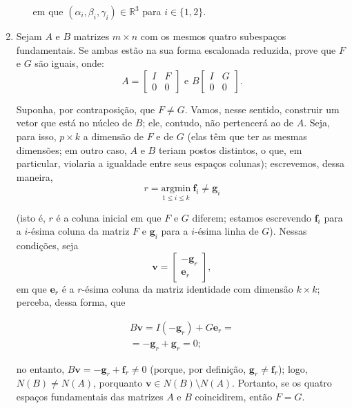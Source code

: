 \documentclass[leqno]{article}
\begin{document}
\begin{enumerate}
\begin{enumerate}
\begin{sol}
		\noindent em que $(\alpha_{i}, \beta_{i}, \gamma_{i}) \in \mathbb{R}^{3}$ para $i \in \{1, 2\}$.  
	\end{sol} 
\end{enumerate}

\item Sejam $A$ e $B$ matrizes $m \times n$ com os mesmos quatro subespaços fundamentais. Se ambas estão na sua forma escalonada reduzida, prove que $F$ e $G$ são iguais, onde:
$$A = \begin{bmatrix}
I & F \\
0 & 0
\end{bmatrix} \mbox{ e } B \begin{bmatrix}
I & G \\
0 & 0
\end{bmatrix}.$$

\begin{sol} 
	Suponha, por contraposição, que $F \neq G$. Vamos, nesse sentido, construir um vetor que está no núcleo de $B$; ele, contudo, não pertencerá ao de $A$. Seja, para isso, $p \times k$ a dimensão de $F$ e de $G$ (elas têm que ter as mesmas dimensões; em outro caso, $A$ e $B$ teriam postos distintos, o que, em particular, violaria a igualdade entre seus espaços colunas); escrevemos, dessa maneira, 
	\begin{equation*} 
		r = \underset{1 \le i \le k}{\mathrm{arg min}} \ \mathbf{f}_{i} \neq \mathbf{g}_{i} 
	\end{equation*} 

	\noindent (isto é, $r$ é a coluna inicial em que $F$ e $G$ diferem; estamos escrevendo $\mathbf{f}_{i}$ para a $i$-ésima coluna da matriz $F$ e $\mathbf{g}_{i}$ para a $i$-ésima linha de $G$). Nessas condições, seja 
	\begin{equation*} 
		\mathbf{v} = 
		\begin{bmatrix} 
			-\mathbf{g}_{r} \\ 
			\mathbf{e}_{r} 
		\end{bmatrix}, 
	\end{equation*} 
	\noindent em que $\mathbf{e}_{r}$ é a $r$-ésima coluna da matriz identidade com dimensão $k \times k$; perceba, dessa forma, que 

	\begin{equation*} 
		\begin{split} 
			B\mathbf{v} = I(-\mathbf{g}_{r}) + G\mathbf{e}_{r} = \\ 
			= -\mathbf{g}_{r} + \mathbf{g}_{r} = 0; 
		\end{split}    
	\end{equation*} 

	\noindent no entanto, $B\mathbf{v} = -\mathbf{g}_{r} + \mathbf{f}_{r} \neq 0$ (porque, por definição, $\mathbf{g}_{r} \neq \mathbf{f}_{r}$); logo, $N(B) \neq N(A)$, porquanto $\mathbf{v} \in N(B)\setminus N(A)$. Portanto, se os quatro espaços fundamentais das matrizes $A$ e $B$ coincidirem, então $F = G$.   
\end{sol} 
\end{enumerate}
\end{document}
